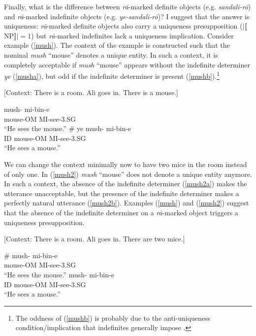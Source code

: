 \documentclass[12pt]{article}
\begin{document}
Finally, what is the difference between \emph{r\={a}}-marked definite objects (e.g. \emph{sandali-r\={o}}) and \emph{r\={a}}-marked indefinite objects (e.g. \emph{ye-sandali-r\={o}})? I suggest that the answer is uniqueness: \emph{r\={a}}-marked definite objects also carry a uniqueness presupposition ($|\llbracket$NP$\rrbracket| = 1$) but \emph{r\={a}}-marked indefinites lack a uniqueness implication. Consider example (\ref{mush}). The context of the example is constructed such that the nominal \emph{mush} ``mouse'' denotes a unique entity. In such a context, it is completely acceptable if \emph{mush} ``mouse'' appears without the indefinite determiner \emph{ye} (\ref{musha}), but odd if the indefinite determiner is present (\ref{mushb}).\footnote{The oddness of (\ref{mushb}) is probably due to the anti-uniqueness condition/implication that indefinites generally impose \citep{heim1991artikel}.}

	\begin {exe}
		\ex \label{mush}{\footnotesize [Context: There is a room. Ali goes in. There is a mouse.]}
		\begin {xlist}
		\ex \label{musha} \gll	mush-	mi-bin-e\\
			mouse-{\scriptsize OM}	{\scriptsize MI}-see-{\scriptsize 3.SG}\\
			``He sees the mouse.''
		\ex \label{mushb} \gll	\# {\color {red}ye}	mush-	mi-bin-e\\
			{}	{\scriptsize ID}	mouse-{\scriptsize OM}	{\scriptsize MI}-see-{\scriptsize 3.SG}\\
			``He sees a mouse.''
		\end {xlist}
	\end {exe}

We can change the context minimally now to have two mice in the room instead of only one. In (\ref{mush2}) \emph{mush} ``mouse'' does not denote a unique entity anymore. In such a context, the absence of the indefinite determiner (\ref{mush2a}) makes the utterance unacceptable, but the presence of the indefinite determiner makes a perfectly natural utterance (\ref{mush2b}). Examples (\ref{mush}) and (\ref{mush2}) suggest that the absence of the indefinite determiner on a \emph{r\={a}}-marked object triggers a uniqueness presupposition. 

	\begin {exe}
		\ex \label{mush2} {\footnotesize [Context: There is a room. Ali goes in. There are two mice.]}
		\begin {xlist}
		\ex \label{mush2a} \gll	\#	mush-	mi-bin-e\\
			{}	mouse-{\scriptsize OM}	{\scriptsize MI}-see-{\scriptsize 3.SG}\\
			``He sees the mouse.''
		\ex \label{mush2b} 	mush-	mi-bin-e\\
			{\scriptsize ID}	mouse-{\scriptsize OM}	{\scriptsize MI}-see-{\scriptsize 3.SG}\\
			``He sees a mouse.''
		\end {xlist}
	\end {exe}
\end{document}
